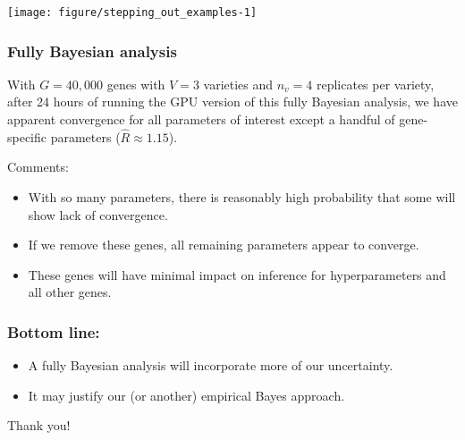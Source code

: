 \documentclass[handout]{beamer}\usepackage[]{graphicx}\usepackage[]{color}
\newenvironment{knitrout}{}{} %
\begin{document}
\begin{frame}
\frametitle{}
\begin{knitrout}\tiny
{}\color{fgcolor}

{\centering \texttt{[image: figure/stepping\_out\_examples-1]} 

}



\end{knitrout}
\end{frame}



\begin{frame}
\frametitle{Fully Bayesian analysis}

With $G=40,000$ genes with $V=3$ varieties and $n_v=4$ replicates per variety, \pause 
after 24 hours of running the GPU version of this fully Bayesian analysis, \pause 
we have apparent convergence for all parameters of interest except a handful of gene-specific parameters ($\hat{R}\approx 1.15$). 

\vspace{0.2in} \pause 

Comments:
\begin{itemize}[<+->]
\item With so many parameters, there is reasonably high probability that some will show lack of convergence.
\item If we remove these genes, all remaining parameters appear to converge. 
\item These genes will have minimal impact on inference for hyperparameters and all other genes. 
\end{itemize}


\end{frame}


\begin{frame}
\frametitle{Bottom line:}

\begin{itemize}[<+->]
\item A fully Bayesian analysis will incorporate more of our uncertainty.
\item It may justify our (or another) empirical Bayes approach. 
\end{itemize}

\vspace{0.5in} \pause

\begin{center}
{\Huge
Thank you!
}
\end{center}

\end{frame}
\end{document}
